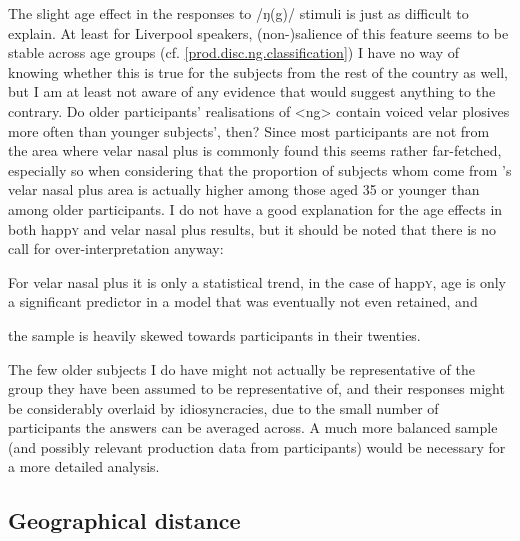 The slight age effect in the responses to /ŋ(g)/ stimuli is just as difficult to explain.
At least for Liverpool speakers, (non-)salience of this feature seems to be stable across age groups (cf. \ref{prod.disc.ng.classification})
I have no way of knowing whether this is true for the subjects from the rest of the country as well, but I am at least not aware of any evidence that would suggest anything to the contrary.
Do older participants' realisations of <ng> contain voiced velar plosives more often than younger subjects', then?
Since most participants are not from the area where velar nasal plus is commonly found this seems rather far-fetched, especially so when considering that the proportion of subjects whom come from \citeauthor{trudgill1999}'s \citeyear{trudgill1999} velar nasal plus area is actually higher among those aged 35 or younger than among older participants.
I do not have a good explanation for the age effects in both happ\textsc{y} and velar nasal plus results, but it should be noted that there is no call for over-interpretation anyway:
	\begin{inparaenum}[(a)]
		\item For velar nasal plus it is only a statistical trend, in the case of happ\textsc{y}, age is only a significant predictor in a model that was eventually not even retained, and
		\item the sample is heavily skewed towards participants in their twenties.
	\end{inparaenum}
The few older subjects I do have might not actually be representative of the group they have been assumed to be representative of, and their responses might be considerably overlaid by idiosyncracies, due to the small number of participants the answers can be averaged across.
A much more balanced sample (and possibly relevant production data from participants) would be necessary for a more detailed analysis.

		\subsection{Geographical distance}


